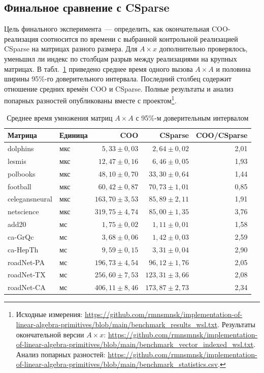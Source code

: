 \documentclass[a4paper]{article}
\begin{document}
\subsection{Финальное сравнение с CSparse}
Цель финального эксперимента~--- определить, как окончательная COO-реализация соотносится по времени с выбранной контрольной реализацией CSparse на матрицах разного размера. Для $A\times x$ дополнительно проверялось, уменьшил ли индекс по столбцам разрыв между реализациями на крупных матрицах. В табл.~\ref{tab:mm} приведено среднее время одного вызова $A\times A$ и половина ширины 95\%-го доверительного интервала. Последний столбец содержит отношение средних времён COO и CSparse. Полные результаты и анализ попарных разностей опубликованы вместе с проектом\footnote{Исходные измерения: \url{https://github.com/rmnsmnsk/implementation-of-linear-algebra-primitives/blob/main/benchmark_results_wsl.txt}. Результаты окончательной версии $A\times x$: \url{https://github.com/rmnsmnsk/implementation-of-linear-algebra-primitives/blob/main/benchmark_vector_indexed_wsl.txt}. Анализ попарных разностей: \url{https://github.com/rmnsmnsk/implementation-of-linear-algebra-primitives/blob/main/benchmark_statistics.csv}.}.
\begin{table}[H]
\centering\scriptsize
\caption{Среднее время умножения матриц $A\times A$ с 95\%-м доверительным интервалом}
\label{tab:mm}
\begin{tabular}{llrrr}
\toprule
Матрица & Единица & COO & CSparse & COO/CSparse\\
\midrule
dolphins & мкс & $5{,}33 \pm 0{,}03$ & $2{,}64 \pm 0{,}02$ & 2{,}01\\
lesmis & мкс & $12{,}47 \pm 0{,}16$ & $6{,}46 \pm 0{,}05$ & 1{,}93\\
polbooks & мкс & $48{,}10 \pm 0{,}70$ & $33{,}30 \pm 0{,}64$ & 1{,}44\\
football & мкс & $60{,}42 \pm 0{,}87$ & $70{,}73 \pm 1{,}01$ & 0{,}85\\
celegansneural & мкс & $163{,}70 \pm 3{,}53$ & $85{,}89 \pm 2{,}11$ & 1{,}91\\
netscience & мкс & $319{,}75 \pm 4{,}74$ & $85{,}00 \pm 1{,}35$ & 3{,}76\\
add20 & мс & $1{,}75 \pm 0{,}02$ & $1{,}11 \pm 0{,}01$ & 1{,}58\\
ca-GrQc & мс & $3{,}68 \pm 0{,}06$ & $1{,}42 \pm 0{,}03$ & 2{,}59\\
ca-HepTh & мс & $9{,}59 \pm 0{,}15$ & $3{,}31 \pm 0{,}04$ & 2{,}90\\
roadNet-PA & мс & $196{,}73 \pm 4{,}54$ & $96{,}12 \pm 1{,}76$ & 2{,}05\\
roadNet-TX & мс & $256{,}60 \pm 7{,}53$ & $123{,}31 \pm 3{,}66$ & 2{,}08\\
roadNet-CA & мс & $406{,}11 \pm 8{,}46$ & $173{,}87 \pm 2{,}73$ & 2{,}34\\
\bottomrule
\end{tabular}
\end{table}
\end{document}
